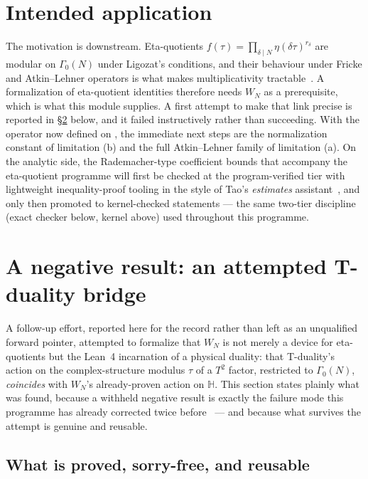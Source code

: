 \documentclass[11pt, a4paper]{article}
\newcommand{\lean}[1]{\ifmmode\text{\ttfamily\detokenize{#1}}\else{\ttfamily\detokenize{#1}}\fi}
\theoremstyle{remark}
\begin{document}
\section{Intended application}

The motivation is downstream. Eta-quotients
$f(\tau) = \prod_{\delta \mid N} \eta(\delta \tau)^{r_\delta}$ are modular on $\Gamma_0(N)$
under Ligozat's conditions, and their behaviour under Fricke and Atkin--Lehner operators is
what makes multiplicativity tractable~\cite{Martin1996}. A formalization of eta-quotient
identities therefore needs $W_N$ as a prerequisite, which is what this module supplies.
A first attempt to make that link precise is reported in \S\ref{sec:tduality} below, and it
failed instructively rather than succeeding. With the operator now defined on \lean{ModularForm}, the immediate next steps are the
normalization constant of limitation (b) and the full Atkin--Lehner family of limitation (a). On the
analytic side, the Rademacher-type coefficient bounds that accompany the eta-quotient
programme will first be checked at the program-verified tier with lightweight
inequality-proof tooling in the style of Tao's \emph{estimates} assistant~\cite{TaoEstimates2025},
and only then promoted to kernel-checked statements --- the same two-tier discipline
(exact checker below, kernel above) used throughout this programme.

\section{A negative result: an attempted T-duality bridge}\label{sec:tduality}

A follow-up effort, reported here for the record rather than left as an unqualified forward
pointer, attempted to formalize that $W_N$ is not merely a device for eta-quotients but the
Lean~4 incarnation of a physical duality: that T-duality's action on the complex-structure
modulus $\tau$ of a $T^2$ factor, restricted to $\Gamma_0(N)$, \emph{coincides} with $W_N$'s
already-proven action on $\mathbb{H}$. This section states plainly what was found, because a
withheld negative result is exactly the failure mode this programme has already corrected twice
before~\cite{FLT2026} --- and because what survives the attempt is genuine and reusable.

\subsection*{What is proved, sorry-free, and reusable}
\end{document}
